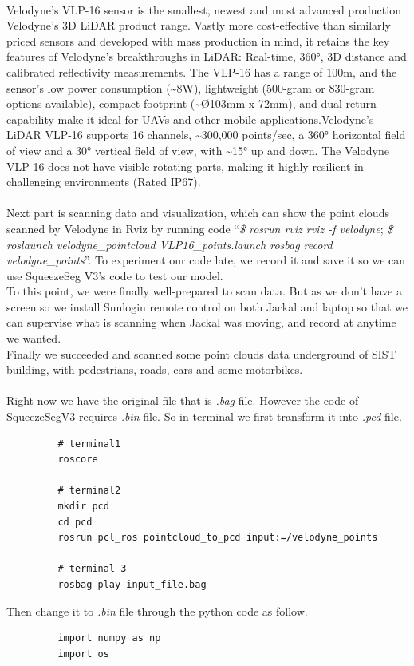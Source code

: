 \documentclass{article}
\begin{document}
\begin{normalsize}
         ~\\
         Velodyne’s VLP-16 sensor is the smallest, newest and most advanced production Velodyne’s 3D LiDAR product range. Vastly more cost-effective than similarly priced sensors and developed with mass production in mind, it retains the key features of Velodyne’s breakthroughs in LiDAR: Real-time, 360°, 3D distance and calibrated reflectivity measurements. The VLP-16 has a range of 100m, and the sensor’s low power consumption (\~{}8W), lightweight (500-gram or 830-gram options available), compact footprint (\~{}Ø103mm x 72mm), and dual return capability make it ideal for UAVs and other mobile applications.Velodyne’s LiDAR VLP-16 supports 16 channels, \~{}300,000 points/sec, a 360° horizontal field of view and a 30° vertical field of view, with \~{}15° up and down. The Velodyne VLP-16 does not have visible rotating parts, making it highly resilient in challenging environments (Rated IP67). \\
         ~\\
         Next part is scanning data and visualization, which can show the point clouds scanned by Velodyne in Rviz by running code “\emph{\$ rosrun rviz rviz -f velodyne}; \emph{\$ roslaunch velodyne\_pointcloud VLP16\_points.launch rosbag record velodyne\_points}”. To experiment our code late, we record it and save it so we can use SqueezeSeg V3’s code to test our model.\\
         To this point, we were finally well-prepared to scan data. But as we don’t have a screen so we install Sunlogin remote control on both Jackal and laptop so that we can supervise what is scanning when Jackal was moving, and record at anytime we wanted.\\
         Finally we succeeded and scanned some point clouds data underground of SIST building, with pedestrians, roads, cars and some motorbikes.\\
         ~\\
         Right now we have the original file that is \emph{.bag} file. However the code of SqueezeSegV3 requires \emph{.bin} file. So in terminal we first transform it into \emph{.pcd} file.
         \begin{lstlisting}
         # terminal1
         roscore

         # terminal2
         mkdir pcd
         cd pcd
         rosrun pcl_ros pointcloud_to_pcd input:=/velodyne_points

         # terminal 3
         rosbag play input_file.bag
         \end{lstlisting}
         Then change it to \emph{.bin} file through the python code as follow.
         \begin{lstlisting}
         import numpy as np
         import os


\end{lstlisting}
\end{normalsize}
\end{document}
